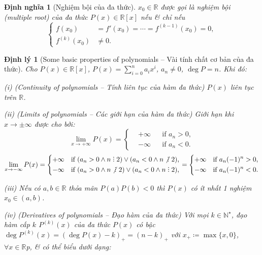 \documentclass{article}
\newtheorem{dinhly}{Định lý}
\newtheorem{dinhnghia}{Định nghĩa}
\DeclareRobustCommand{\divby}{%
	\mathrel{\vbox{\baselineskip.65ex\lineskiplimit0pt\hbox{.}\hbox{.}\hbox{.}}}%
}
\begin{document}
\begin{dinhnghia}[Nghiệm bội của đa thức]
	$x_0\in\mathbb{R}$ được gọi là {\rm nghiệm bội} (multiple root) của đa thức $P(x)\in\mathbb{R}[x]$ nếu \& chỉ nếu
	\begin{equation*}
		\left\{\begin{split}
			f(x_0) &= f'(x_0) = \cdots = f^{(k - 1)}(x_0) = 0,\\
			f^{(k)}(x_0)&\ne0.
		\end{split}\right.
	\end{equation*}
\end{dinhnghia}

\begin{dinhly}[Some basic properties of polynomials -- Vài tính chất cơ bản của đa thức]
	Cho $P(x)\in\mathbb{R}[x]$, $P(x) = \sum_{i=0}^n a_ix^i$, $a_n\ne0$, $\deg P = n$. Khi đó:
	\item(i) {\rm(Continuity of polynomials -- Tính liên tục của hàm đa thức)} $P(x)$ liên tục trên $\mathbb{R}$.
	\item(ii) {\rm(Limits of polynomials -- Các giới hạn của hàm đa thức)} Giới hạn khi $x\to\pm\infty$ được cho bởi:
	\begin{equation*}
		\lim_{x\to+\infty} P(x) = \left\{\begin{split}
			&+\infty&&\mbox{if } a_n > 0,\\
			&-\infty&&\mbox{if } a_n < 0.
		\end{split}\right.
	\end{equation*}
	\begin{equation*}
		\lim_{x\to-\infty} P(x) = \left\{\begin{split}
			+&\infty&&\mbox{if }(a_n > 0\land n\divby2)\lor(a_n < 0\land n\not{\divby}\ 2),\\
			-&\infty&&\mbox{if }(a_n > 0\land n\not{\divby}\ 2)\lor(a_n < 0\land n\divby2),
		\end{split}\right. = \left\{\begin{split}
			+&\infty&&\mbox{if } a_n(-1)^n > 0,\\
			-&\infty&&\mbox{if } a_n(-1)^n < 0.
		\end{split}\right.
	\end{equation*}
	\item(iii) Nếu có $a,b\in\mathbb{R}$ thỏa mãn $P(a)P(b) < 0$ thì $P(x)$ có ít nhất 1 nghiệm $x_0\in(a,b)$.
	\item(iv) {\rm(Derivatives of polynomials -- Đạo hàm của đa thức)} Với mọi $k\in\mathbb{N}^\star$, đạo hàm cấp $k$ $P^{(k)}(x)$ của đa thức $P(x)$ có bậc $\deg P^{(k)}(x) = (\deg P(x) - k)_+ = (n - k)_+$ với $x_+\coloneqq\max\{x,0\}$, $\forall x\in\mathbb{R}$p, \& có thể biểu dưới dạng:

\end{dinhly}
\end{document}
